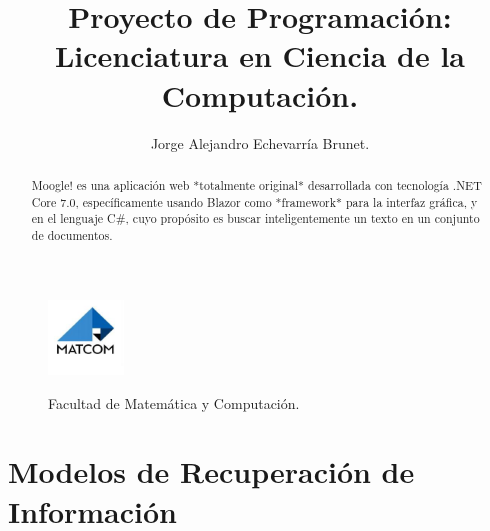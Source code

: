\documentclass{article}
\begin{document}
\title{Proyecto de Programación:\\ Licenciatura en Ciencia de la Computación.}
\author{Jorge Alejandro Echevarría Brunet.}
\date{}
\maketitle

\begin{figure}[h]
	\center
	\includegraphics[width=2cm]{images/matcom.jpg}
	\label{fig:logo}

	\begin{center}
		\Large Facultad de Matemática y Computación.
	\end{center}
\end{figure}

\begin{abstract}
	Moogle! es una aplicación web *totalmente original* desarrollada con tecnología
	.NET Core 7.0, específicamente usando Blazor como *framework* para la interfaz
	gráfica, y en el lenguaje C\#, cuyo propósito es buscar inteligentemente un texto
	en un conjunto de documentos.
\end{abstract}


\section*{Modelos de Recuperación de Información}
\end{document}
